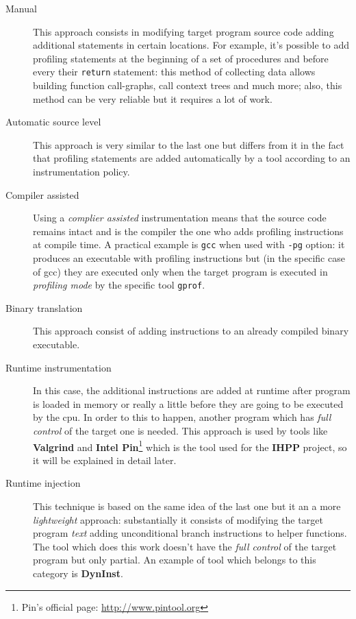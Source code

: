 \documentclass[a4paper,11pt]{report}
\begin{document}
\begin{description}
\begin{description}
\item[Manual]
This approach consists in modifying target program source code adding additional statements in certain locations. For example, it's possible to add profiling statements at the beginning of a set of procedures and before every their \verb|return| statement: this method of collecting data allows building function call-graphs, call context trees and much more; also, this method can be very reliable but it requires a lot of work.

\item[Automatic source level]
This approach is very similar to the last one but differs from it in the fact that profiling statements are added automatically by a tool according to an instrumentation policy.

\item[Compiler assisted]
Using a \emph{complier assisted} instrumentation means that the source code remains intact and is the compiler the one who adds profiling instructions at compile time. A practical example is \verb|gcc| when used with \verb|-pg| option: it produces an executable with profiling instructions but (in the specific case of gcc) they are executed only when the target program is executed in \emph{profiling mode} by the specific tool \verb|gprof|.

\item[Binary translation]
This approach consist of adding instructions to an already compiled binary executable.

\item[Runtime instrumentation]
In this case, the additional instructions are added at runtime after program is loaded in memory or really a little before 
they are going to be executed by the cpu. In order to this to happen, another program which has \emph{full control} of the target one is needed. This approach is used by tools like \textbf{Valgrind} and \textbf{Intel Pin}\footnote{Pin's official page: \url{http://www.pintool.org}} which is the tool used for the \textbf{IHPP} project, so it will be explained in detail later.

\item[Runtime injection]
This technique is based on the same idea of the last one but it an a more \emph{lightweight} approach: substantially it consists of modifying the target program \emph{text} adding unconditional branch instructions to helper functions. The tool which does this work doesn't have the \emph{full control} of the target program but only partial. An example of tool which belongs to this category is \textbf{DynInst}.


\end{description}
\end{description}
\end{document}
